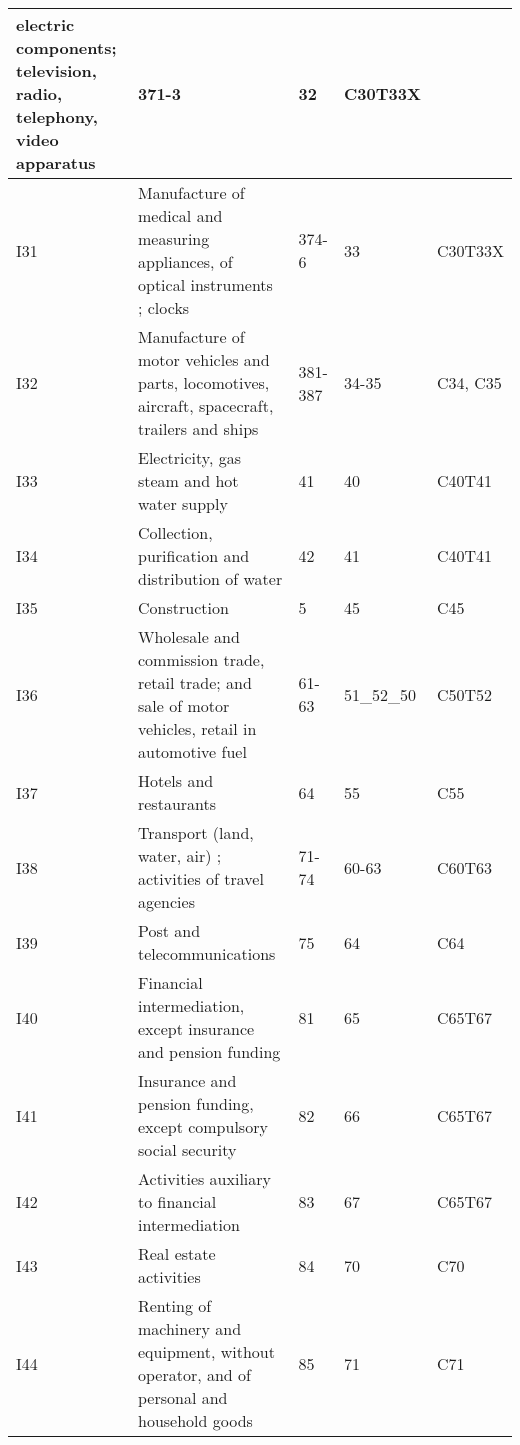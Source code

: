 \documentclass[12pt,english]{article}
\begin{document}
\begin{table}[ht]
\begin{adjustbox}{width=\textwidth}
\begin{tabular}{lp{500pt}lll}
		electric components; television, %
		radio, %
		telephony, %
		video %
		apparatus %
		& 371-3 & 32 & C30T33X \\ \midrule
		I31 & Manufacture of medical and measuring appliances, %
		of optical instruments %
		; %
		clocks & 374-6 & 33 & C30T33X \\ \midrule
		I32 & Manufacture of motor vehicles and parts, %
		locomotives, aircraft, spacecraft, trailers and %
		ships%
		& 381-387 & 34-35 & C34, C35 \\ \midrule
		I33 & Electricity, gas steam and hot water supply & 41 & 40 & C40T41 \\ \midrule
		I34 & Collection, purification and distribution of water & 42 & 41 & C40T41 \\ \midrule
		I35 & Construction & 5 & 45 & C45 \\ \midrule
		I36 & Wholesale and commission trade, retail trade; and sale of motor vehicles, retail in automotive fuel & 61-63 & 51\_52\_50 & C50T52 \\ \midrule
		I37 & Hotels and restaurants & 64 & 55 & C55 \\ \midrule
		I38 & Transport (land, water, air) ; %
		activities of travel agencies & 71-74 & 60-63 & C60T63 \\ \midrule
		I39 & Post and telecommunications & 75 & 64 & C64 \\ \midrule
		I40 & Financial intermediation, except insurance and pension funding & 81 & 65 & C65T67 \\ \midrule
		I41 & Insurance and pension funding, except compulsory social security  & 82 & 66 & C65T67 \\ \midrule
		I42 & Activities auxiliary to financial intermediation & 83 & 67 & C65T67 \\ \midrule
		I43 & Real estate activities & 84 & 70 & C70 \\ \midrule
		I44 & Renting of machinery and equipment, without operator, and of personal and household goods & 85 & 71 & C71 \\ \midrule

\end{tabular}
\end{adjustbox}
\end{table}
\end{document}
